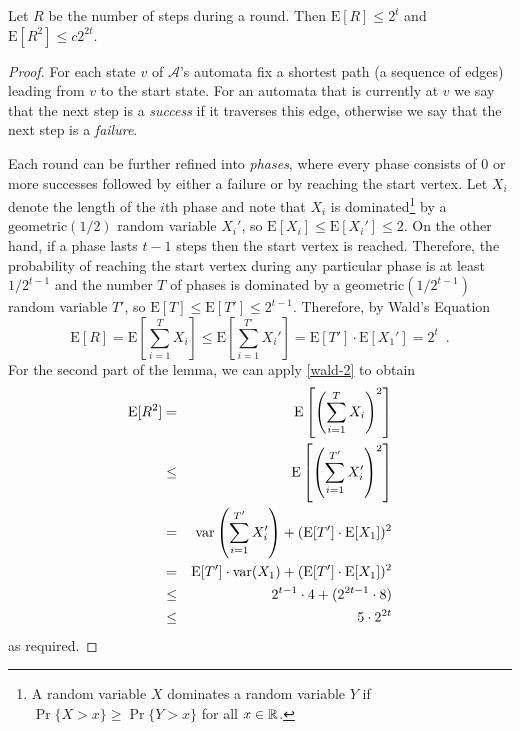\documentclass[lotsofwhite]{patmorin}
\newcommand{\E}{\mathrm{E}}
\DeclareMathOperator{\var}{var}
\begin{document}
\begin{lem}
Let $R$ be the number of steps during a round. Then 
$\E[R] \le 2^t$ and $\E[R^2] \le c2^{2t}$.
\end{lem}

\begin{proof}
For each state $v$ of $\mathcal{A}$'s automata fix a shortest path
(a sequence of edges) leading from $v$ to the start state.  For an
automata that is currently at $v$ we say that the next step is a
\emph{success} if it traverses this edge, otherwise we say that the
next step is a \emph{failure}.

Each round can be further refined into \emph{phases}, where every
phase consists of 0 or more successes followed by either a failure or
by reaching the start vertex.  Let $X_i$ denote the length of the
$i$th phase and note that $X_i$ is dominated\footnote{A random
variable $X$ dominates a random variable $Y$ if $\Pr\{X > x\}\ge
\Pr\{Y > x\}$ for all $x\in\mathbb{R}$.} by a $\mathrm{geometric}(1/2)$ random
variable $X_i'$, so $\E[X_i]\le\E[X_i']\le 2$.  On the other hand, if a phase lasts
$t-1$ steps then the start vertex is reached.  Therefore, the
probability of reaching the start vertex during any particular phase
is at least $1/2^{t-1}$ and the number $T$ of phases is dominated by a
$\mathrm{geometric}(1/2^{t-1})$ random variable $T'$, so
$\E[T]\le\E[T']\le 2^{t-1}$.
Therefore, by Wald's Equation
\[
  \E[R] = \E\left[\sum_{i=1}^T X_i\right]\le \E\left[\sum_{i=1}^{T'}
X_i'\right] = \E[T']\cdot\E[X_1'] = 2^t \enspace .
\]
For the second part of the lemma, we can apply \eqref{wald-2} to
obtain
\begin{eqnarray*}
  \E[R^2] & = & \E\left[\left(\sum_{i=1}^T X_i\right)^2\right] \\
          &\le& \E\left[\left(\sum_{i=1}^{T'} X_i'\right)^2\right] \\
          & = & \var\left(\sum_{i=1}^{T'} X_i'\right) + (\E[T']\cdot\E[X_1])^2 \\
          & = & \E[T']\cdot\var(X_1) + (\E[T']\cdot\E[X_1])^2 \\
          & \le & 2^{t-1}\cdot 4 + (2^{2t-1}\cdot 8) \\
          & \le & 5\cdot2^{2t}
\comment{
          & = & \E\left[\sum_{i=1}^{T'} (X_i')^2
                + \sum_{i=1}^{T'}\sum_{j=i+1}^{T'} 2X_i'X_j' \right] \\
          & = & \E\left[\sum_{i=1}^{T'} (X_i')^2\right]
                + \E\left[\sum_{i=1}^{T'}\sum_{j=i+1}^{T'} 2X_i'X_j'\right] \\
          & = & \E[T']\cdot \E\left[(X_i')^2\right]
                + \E\left[\sum_{i=1}^T\sum_{j=i+1}^{T'} 2X_i'X_j'\right] \\
          & = & \E[T']\cdot \E\left[(X_i')^2\right]
                + \E\left[\sum_{i=1}^T\sum_{j=i+1}^{T'} 2X_i'X_j'\right] \\

}
\end{eqnarray*}
as required.
\end{proof}
\end{document}
